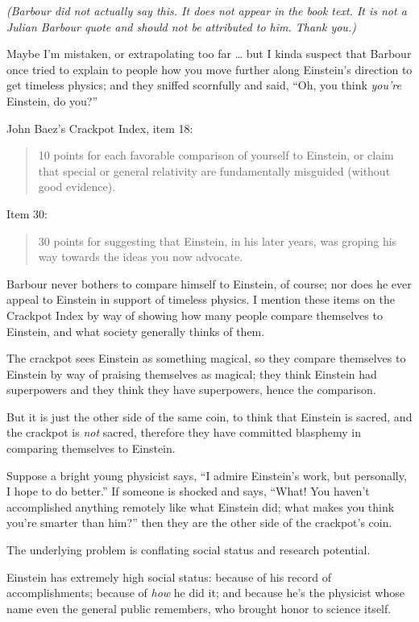 {
 \textit{(Barbour did not actually say this. It does not appear in
the book text. It is not a Julian Barbour quote and should not be
attributed to him. Thank you.)}}

{
 Maybe I'm mistaken, or extrapolating too far \ldots
but I kinda suspect that Barbour once tried to explain to people how
you move further along Einstein's direction to get
timeless physics; and they sniffed scornfully and said,
``Oh, you think \textit{you're}
Einstein, do you?''}

{
 John Baez's Crackpot Index, item 18:}

\begin{quote}
{
 10 points for each favorable comparison of yourself to Einstein,
or claim that special or general relativity are fundamentally misguided
(without good evidence).}
\end{quote}

{
 Item 30:}

\begin{quote}
{
 30 points for suggesting that Einstein, in his later years, was
 groping his way towards the ideas you now advocate.}
\end{quote}

{
 Barbour never bothers to compare himself to Einstein, of course;
nor does he ever appeal to Einstein in support of timeless physics. I
mention these items on the Crackpot Index by way of showing how many
people compare themselves to Einstein, and what society generally
thinks of them.}

{
 The crackpot sees Einstein as something magical, so they compare
themselves to Einstein by way of praising themselves as magical; they
think Einstein had superpowers and they think they have superpowers,
hence the comparison.}

{
 But it is just the other side of the same coin, to think that
Einstein is sacred, and the crackpot is \textit{not} sacred, therefore
they have committed blasphemy in comparing themselves to Einstein.}

{
 Suppose a bright young physicist says, ``I admire
Einstein's work, but personally, I hope to do
better.'' If someone is shocked and says,
``What! You haven't accomplished
anything remotely like what Einstein did; what makes you think
you're smarter than him?'' then they
are the other side of the crackpot's coin.}

{
 The underlying problem is conflating social status and research
potential.}

{
 Einstein has extremely high social status: because of his record
of accomplishments; because of \textit{how} he did it; and because
he's the physicist whose name even the general public
remembers, who brought honor to science itself.}

